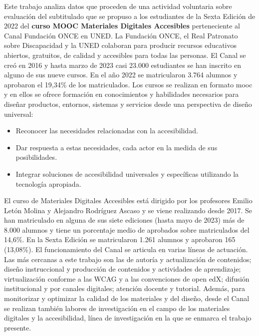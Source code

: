 \documentclass[
  12pt,
  a4paper,
  extrafontsizes,
  onecolumn,
  openright,
  table]{memoir}
\providecommand{\tightlist}{%
  \setlength{\itemsep}{0pt}\setlength{\parskip}{0pt}}\usepackage{longtable,booktabs,array}
\begin{document}
Este trabajo analiza datos que proceden de una actividad voluntaria
sobre evaluación del subtitulado que se propuso a los estudiantes de la
Sexta Edición de 2022 del \textbf{curso MOOC Materiales Digitales
Accesibles} perteneciente al Canal Fundación ONCE en UNED. La Fundación
ONCE, el Real Patronato sobre Discapacidad y la UNED colaboran para
producir recursos educativos abiertos, gratuitos, de calidad y
accesibles para todas las personas. El Canal se creó en 2016 y hasta
marzo de 2023 casi 23.000 estudiantes se han inscrito en alguno de sus
nueve cursos. En el año 2022 se matricularon 3.764 alumnos y aprobaron
el 19,34\% de los matriculados. Los cursos se realizan en formato
\gls{mooc} y en ellos se ofrece formación en conocimientos y habilidades
necesarios para diseñar productos, entornos, sistemas y servicios desde
una perspectiva de diseño universal:

\begin{itemize}
\tightlist
\item
  Reconocer las necesidades relacionadas con la accesibilidad.
\item
  Dar respuesta a estas necesidades, cada actor en la medida de sus
  posibilidades.
\item
  Integrar soluciones de accesibilidad universales y específicas
  utilizando la tecnología apropiada.
\end{itemize}

El curso de Materiales Digitales Accesibles está dirigido por los
profesores Emilio Letón Molina y Alejandro Rodríguez Ascaso y se viene
realizando desde 2017. Se han matriculado en alguna de sus siete
ediciones (hasta mayo de 2023) más de 8.000 alumnos y tiene un
porcentaje medio de aprobados sobre matriculados del 14,6\%. En la Sexta
Edición se matricularon 1.261 alumnos y aprobaron 165 (13,08\%). El
funcionamiento del Canal se articula en varias líneas de actuación. Las
más cercanas a este trabajo son las de autoría y actualización de
contenidos; diseño instruccional y producción de contenidos y
actividades de aprendizaje; virtualización conforme a las WCAG y a las
convenciones de open edX; difusión institucional y por canales
digitales; atención docente y tutorial. Además, para monitorizar y
optimizar la calidad de los materiales y del diseño, desde el Canal se
realizan también labores de investigación en el campo de los materiales
digitales y la accesibilidad, línea de investigación en la que se
enmarca el trabajo presente.
\end{document}
